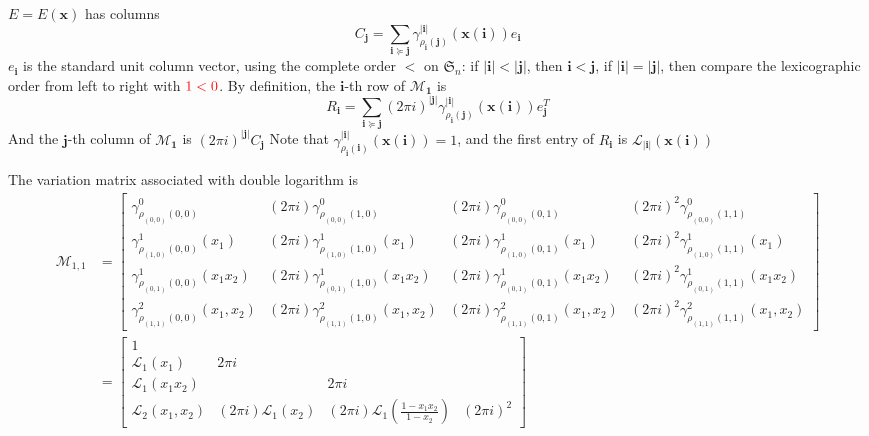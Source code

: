 \documentclass[main]{subfiles}
\begin{document}
$E=E(\mathbf x)$ has columns
\[C_{\mathbf j}=\sum_{\mathbf i\succeq\mathbf j}\gamma^{|\mathbf i|}_{\rho_{\mathbf i}(\mathbf j)}(\mathbf x(\mathbf i))e_{\mathbf i}\]
$e_{\mathbf i}$ is the standard unit column vector, using the complete order $\mathbf <$ on $\mathfrak S_n$: if $|\mathbf i|<|\mathbf j|$, then $\mathbf i<\mathbf j$, if $|\mathbf i|=|\mathbf j|$, then compare the lexicographic order from left to right with $\color{red}{1<0}$. By definition, the $\mathbf i$-th row of $\mathcal M_{\mathbf 1}$ is
\[R_{\mathbf i}=\sum_{\mathbf i\succeq\mathbf j}(2\pi i)^{|\mathbf j|}\gamma^{|\mathbf i|}_{\rho_{\mathbf i}(\mathbf j)}(\mathbf x(\mathbf i))e_{\mathbf j}^T\]
And the $\mathbf j$-th column of $\mathcal M_{\mathbf1}$ is $(2\pi i)^{|\mathbf j|}C_{\mathbf j}$
Note that $\gamma^{|\mathbf i|}_{\rho_{\mathbf i}(\mathbf i)}(\mathbf x(\mathbf i))=1$, and the first entry of $R_{\mathbf i}$ is $\mathcal L_{|\mathbf i|}(\mathbf x(\mathbf i))$

\begin{example}
The variation matrix associated with double logarithm is
\begin{align*}
\mathcal M_{1,1}&=\left[\begin{smallmatrix}
\gamma^0_{\rho_{(0,0)}(0,0)}  &  (2\pi i)\gamma^0_{\rho_{(0,0)}(1,0)}  &  (2\pi i)\gamma^0_{\rho_{(0,0)}(0,1)}  &  (2\pi i)^2\gamma^0_{\rho_{(0,0)}(1,1)} \\
\gamma^1_{\rho_{(1,0)}(0,0)}(x_1)  &  (2\pi i)\gamma^1_{\rho_{(1,0)}(1,0)}(x_1)  &  (2\pi i)\gamma^1_{\rho_{(1,0)}(0,1)}(x_1)  &  (2\pi i)^2\gamma^1_{\rho_{(1,0)}(1,1)}(x_1) \\
\gamma^1_{\rho_{(0,1)}(0,0)}(x_1x_2)  &  (2\pi i)\gamma^1_{\rho_{(0,1)}(1,0)}(x_1x_2)  &  (2\pi i)\gamma^1_{\rho_{(0,1)}(0,1)}(x_1x_2)  &  (2\pi i)^2\gamma^1_{\rho_{(0,1)}(1,1)}(x_1x_2) \\
\gamma^2_{\rho_{(1,1)}(0,0)}(x_1,x_2)  &  (2\pi i)\gamma^2_{\rho_{(1,1)}(1,0)}(x_1,x_2)  &  (2\pi i)\gamma^2_{\rho_{(1,1)}(0,1)}(x_1,x_2)  &  (2\pi i)^2\gamma^2_{\rho_{(1,1)}(1,1)}(x_1,x_2)
\end{smallmatrix}\right] \\
&=\begin{bmatrix}
1&&& \\
\mathcal L_1(x_1)&2\pi i&& \\
\mathcal L_1(x_1x_2)&&2\pi i& \\
\mathcal L_2(x_1,x_2)&(2\pi i)\mathcal L_1(x_2)&(2\pi i)\mathcal L_1\left(\frac{1-x_1x_2}{1-x_2}\right)&(2\pi i)^2
\end{bmatrix}
\end{align*}
\end{example}
\end{document}
